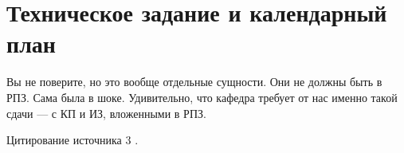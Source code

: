 \section{Техническое задание и календарный план}

Вы не поверите, но это вообще отдельные сущности. Они не должны быть
в РПЗ. Сама была в шоке. Удивительно, что кафедра требует от нас
именно такой сдачи --- с КП и ИЗ, вложенными в РПЗ.

\lipsum[1-3]

Цитирование источника 3 \cite{Wikipedia3}.
